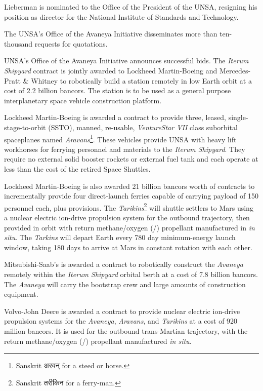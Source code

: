 Lieberman is nominated to the Office of the President of the UNSA, resigning his position as director for the National Institute of Standards and Technology.
\StopTimelineDate

The UNSA's Office of the Avaneya Initiative disseminates more than ten-thousand requests for quotations.
\StopTimelineDate

UNSA's Office of the Avaneya Initiative announces successful bids. The {\it Iterum Shipyard} contract is jointly awarded to Lockheed Martin-Boeing and Mercedes-Pratt & Whitney to robotically build a station remotely in low Earth orbit at a cost of 2.2 billion bancors. The station is to be used as a general purpose interplanetary space vehicle construction platform.

Lockheed Martin-Boeing is awarded a contract to provide three, leased, single-stage-to-orbit (SSTO), manned, re-usable, {\it VentureStar VII} class suborbital spaceplanes named {\it Aravans}\footnote{Sanskrit अरवन् for a steed or horse.}. These vehicles provide UNSA with heavy lift workhorses for ferrying personnel and materials to the {\it Iterum Shipyard}. They require no external solid booster rockets or external fuel tank and each operate at less than  the cost of the retired Space Shuttles.

Lockheed Martin-Boeing is also awarded 21 billion bancors worth of contracts to incrementally provide four direct-launch ferries capable of carrying payload of 150 personnel each, plus provisions. The {\it Tarikins}\footnote{Sanskrit तरीकिन for a ferry-man.} will shuttle settlers to Mars using a nuclear electric ion-drive propulsion system for the outbound trajectory, then provided in orbit with return methane/oxygen (/) propellant manufactured in {\it in situ}. The {\it Tarkins} will depart Earth every 780 day minimum-energy launch window, taking 180 days to arrive at Mars in constant rotation with each other.

Mitsubishi-Saab's is awarded a contract to robotically construct the {\it Avaneya} remotely within the {\it Iterum Shipyard} orbital berth at a cost of 7.8 billion bancors. The {\it Avaneya} will carry the bootstrap crew and large amounts of construction equipment.

Volvo-John Deere is awarded a contract to provide nuclear electric ion-drive propulsion systems for the {\it Avaneya}, {\it Aravans}, and {\it Tarikins} at a cost of 920 million bancors. It is used for the outbound trans-Martian trajectory, with the return methane/oxygen (/) propellant manufactured {\it in situ}.


